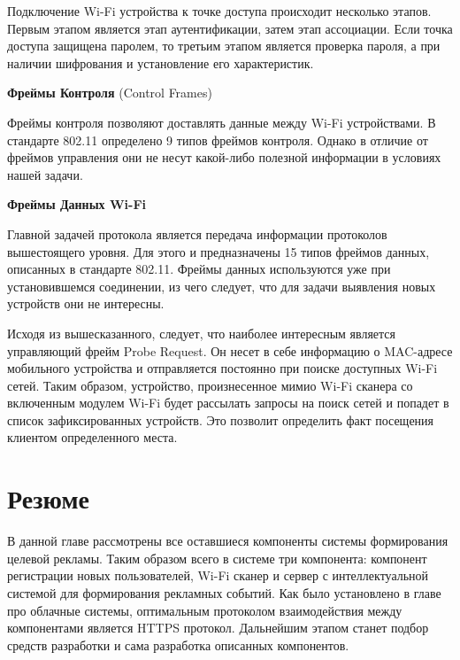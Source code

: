 Подключение Wi-Fi устройства к точке доступа происходит несколько этапов. Первым этапом является этап аутентификации, затем этап ассоциации. Если точка доступа защищена паролем, то третьим этапом является проверка пароля, а при наличии шифрования и установление его характеристик.

\textbf{Фреймы Контроля} (Control Frames)

Фреймы контроля позволяют доставлять данные между Wi-Fi устройствами. В стандарте 802.11 определено 9 типов фреймов контроля. Однако в отличие от фреймов управления они не несут какой-либо полезной информации в условиях нашей задачи.

\textbf{Фреймы Данных Wi-Fi}

Главной задачей протокола является передача информации протоколов вышестоящего уровня. Для этого и предназначены 15 типов фреймов данных, описанных в стандарте 802.11. Фреймы данных используются уже при установившемся соединении, из чего следует, что для задачи выявления новых устройств они не интересны.

Исходя из вышесказанного, следует, что наиболее интересным является управляющий фрейм Probe Request. Он несет в себе информацию о MAC-адресе мобильного устройства и отправляется постоянно при поиске доступных Wi-Fi сетей. Таким образом, устройство, произнесенное мимио Wi-Fi сканера со включенным модулем Wi-Fi будет рассылать запросы на поиск сетей и попадет в список зафиксированных устройств. Это позволит определить факт посещения клиентом определенного места.


\section{Резюме}

В данной главе рассмотрены все оставшиеся компоненты системы формирования целевой рекламы. Таким образом всего в системе три компонента: компонент регистрации новых пользователей, Wi-Fi сканер и сервер с интеллектуальной системой для формирования рекламных событий. Как было установлено в главе про облачные системы, оптимальным протоколом взаимодействия между компонентами является HTTPS протокол. Дальнейшим этапом станет подбор средств разработки и сама разработка описанных компонентов.
